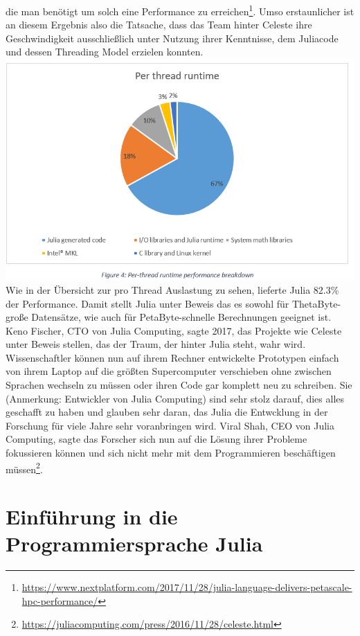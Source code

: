 \documentclass[proseminar,german,utf8]{zihpub}
\begin{document}
die man benötigt um solch eine Performance zu erreichen\footnote{\url{https://www.nextplatform.com/2017/11/28/julia-language-delivers-petascale-hpc-performance/}}. Umso erstaunlicher ist an diesem Ergebnis also die Tatsache, dass das Team hinter Celeste ihre Geschwindigkeit ausschließlich unter Nutzung ihrer Kenntnisse, dem Juliacode und dessen Threading Model erzielen konnten.\includegraphics[scale=0.5]{celestejulia.png}  Wie in der Übersicht zur pro Thread Auslastung zu sehen, lieferte Julia 82.3\% der Performance. Damit stellt Julia unter Beweis das es sowohl für ThetaByte-große Datensätze, wie auch für PetaByte-schnelle Berechnungen geeignet ist. Keno Fischer, CTO von Julia Computing, sagte 2017, das Projekte wie Celeste unter Beweis stellen, das der Traum, der hinter Julia steht, wahr wird. Wissenschaftler können nun auf ihrem Rechner entwickelte Prototypen einfach von ihrem Laptop auf die größten Supercomputer verschieben ohne zwischen Sprachen wechseln zu müssen oder ihren Code gar komplett neu zu schreiben. Sie (Anmerkung: Entwickler von Julia Computing) sind sehr stolz darauf, dies alles geschafft zu haben und glauben sehr daran, das Julia die Entwcklung in der Forschung für viele Jahre sehr voranbringen wird. Viral Shah, CEO von Julia Computing, sagte das Forscher sich nun auf die Lösung ihrer Probleme fokussieren können und sich nicht mehr mit dem Programmieren beschäftigen müssen\footnote{\url{https://juliacomputing.com/press/2016/11/28/celeste.html}}.

\section{Einführung in die Programmiersprache Julia}
\end{document}
